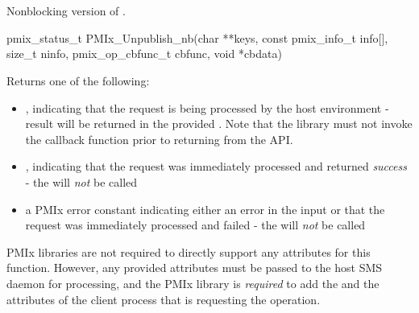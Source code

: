\section{}

\summary

Nonblocking version of .

\format

\cspecificstart
\begin{codepar}
pmix_status_t
PMIx_Unpublish_nb(char **keys,
                  const pmix_info_t info[], size_t ninfo,
                  pmix_op_cbfunc_t cbfunc, void *cbdata)
\end{codepar}
\cspecificend

\begin{arglist}
\end{arglist}

Returns one of the following:

\begin{itemize}
    \item {}, indicating that the request is being processed by the host environment - result will be returned in the provided . Note that the library must not invoke the callback function prior to returning from the \ac{API}.
    \item {}, indicating that the request was immediately processed and returned \textit{success} - the  will \textit{not} be called
    \item a PMIx error constant indicating either an error in the input or that the request was immediately processed and failed - the  will \textit{not} be called
\end{itemize}

\reqattrstart
\ac{PMIx} libraries are not required to directly support any attributes for this function. However, any provided attributes must be passed to the host \ac{SMS} daemon for processing, and the \ac{PMIx} library is \textit{required} to add the  and the  attributes of the client process that is requesting the operation.

